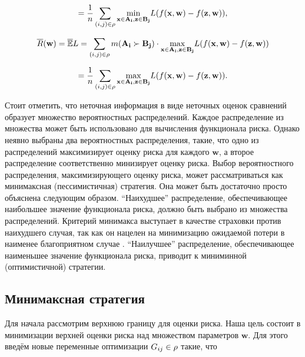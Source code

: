 \documentclass[12pt,a4paper,oneside]{article}
\begin{document}
\[
= \frac{1}{n} \sum \limits_{(i,j) \in \Rho} \underset{%
\mathbf{x} \in \mathbf{A_i}, \mathbf{z} \in \mathbf{B_j}%
}{\operatorname{min}}%
L(f(\mathbf{x}, \mathbf{w}) - f(\mathbf{z}, \mathbf{w})),
\]

\[
\overline{R}(\mathbf{w}) = \mathbb{\overline{E}} L = \sum \limits_{(i,j) \in \Rho} m(\mathbf{A_i} \succ \mathbf{B_j}) \cdot \underset{%
	\mathbf{x} \in \mathbf{A_i}, \mathbf{z} \in \mathbf{B_j}%
}{\operatorname{max}}
L (f (\mathbf{x}, \mathbf{w}) - f(\mathbf{z}, \mathbf{w}))
\]

\[
= \frac{1}{n} \sum \limits_{(i,j) \in \Rho} \underset{%
	\mathbf{x} \in \mathbf{A_i}, \mathbf{z} \in \mathbf{B_j}%
}{\operatorname{max}}%
L (f(\mathbf{x}, \mathbf{w}) - f(\mathbf{z}, \mathbf{w})).
\]

\par
Стоит отметить, что неточная информация в виде неточных оценок сравнений образует множество вероятностных распределений. 
Каждое распределение из множества может быть использовано для вычисления функционала риска.
Однако неявно выбраны два вероятностных распределения, такие, что одно из распределений максимизирует оценку риска для каждого \(\mathbf{w}\), а второе распределение соответственно минизирует оценку риска. 
Выбор вероятностного распределения, максимизирующего оценку риска, может рассматриваться как минимаксная (пессимистичная) стратегия. 
Она может быть достаточно просто объяснена следующим образом. 
``Наихудшее'' распределение, обеспечивающее наибольшее значение функционала риска, должно быть выбрано из множества распределений. 
Критерий минимакса выступает в качестве страховки против наихудшего случая, так как он нацелен на минимизацию ожидаемой потери в наименее благоприятном случае . 
``Наилучшее'' распределение, обеспечивающее наименьшее значение функционала риска, приводит к миниминной (оптимистичной) стратегии.


\subsection{Минимаксная стратегия}

\par
Для начала рассмотрим верхнюю границу для оценки риска. 
Наша цель состоит в минимизации верхней оценки риска над множеством параметров \(\mathbf{w}\). 
Для этого введём новые переменные оптимизации \(G_{ij} \in \mathrm{\rho}\) такие, что
\end{document}
